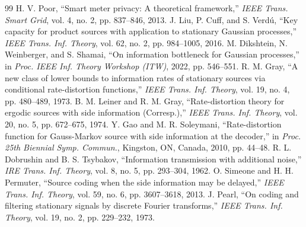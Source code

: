 \documentclass[11pt,onecolumn]{IEEEtran}
\begin{document}
\begin{thebibliography}{99}
H. V. Poor, ``Smart meter privacy: A theoretical framework,'' \emph{IEEE
Trans. Smart Grid}, vol. 4, no. 2, pp. 837--846, 2013.
 J. Liu, P. Cuff, and S. Verd\'u, ``Key capacity for
product sources with application to stationary Gaussian processes,''
\emph{IEEE Trans. Inf. Theory}, vol. 62, no. 2, pp. 984--1005, 2016.
 M. Dikshtein, N. Weinberger, and S. Shamai, ``On
information bottleneck for Gaussian processes,'' in \emph{Proc. IEEE Inf.
Theory Workshop (ITW)}, 2022, pp. 546--551.
 R. M. Gray, ``A new class of lower bounds to information
rates of stationary sources via conditional rate-distortion functions,''
\emph{IEEE Trans. Inf. Theory}, vol. 19, no. 4, pp. 480--489, 1973.
 B. M. Leiner and R. M. Gray, ``Rate-distortion theory
for ergodic sources with side information (Corresp.),'' \emph{IEEE Trans.
Inf. Theory}, vol. 20, no. 5, pp. 672--675, 1974.
 Y. Gao and M. R. Soleymani, ``Rate-distortion function
for Gauss-Markov source with side information at the decoder,'' in
\emph{Proc. 25th Biennial Symp. Commun.}, Kingston, ON, Canada, 2010,
pp. 44--48.
 R. L. Dobrushin and B. S. Tsybakov, ``Information
transmission with additional noise,'' \emph{IRE Trans. Inf. Theory},
vol. 8, no. 5, pp. 293--304, 1962.
 O. Simeone and H. H. Permuter, ``Source coding when
the side information may be delayed,'' \emph{IEEE Trans. Inf. Theory},
vol. 59, no. 6, pp. 3607--3618, 2013.
 J. Pearl, ``On coding and filtering stationary signals
by discrete Fourier transforms,'' \emph{IEEE Trans. Inf. Theory}, vol. 19,
no. 2, pp. 229--232, 1973.

\end{thebibliography}
\end{document}
